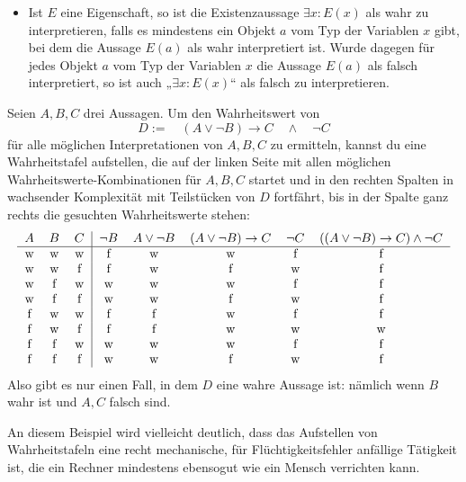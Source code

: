 \begin{de}[Interpretation]
\begin{itemize}
        \item Ist $E$ eine Eigenschaft, so ist die Existenzaussage $\exists x: E(x)$ als wahr zu interpretieren, falls es mindestens ein Objekt $a$ vom Typ der Variablen $x$ gibt, bei dem die Aussage $E(a)$ als wahr interpretiert ist. Wurde dagegen für jedes Objekt $a$ vom Typ der Variablen $x$ die Aussage $E(a)$ als falsch interpretiert, so ist auch „$\exists x: E(x)$“ als falsch zu interpretieren.
    \end{itemize}
\end{de}


\begin{bsp}
    Seien $A,B,C$ drei Aussagen. Um den Wahrheitswert von
        \[ D:= \quad (A\lor \neg B) \to C\quad \land\quad \neg C\]
    für alle möglichen Interpretationen von $A,B,C$ zu ermitteln, kannst du eine Wahrheitstafel aufstellen, die auf der linken Seite mit allen möglichen Wahrheitswerte-Kombinationen für $A,B,C$ startet und in den rechten Spalten in wachsender Komplexität mit Teilstücken von $D$ fortfährt, bis in der Spalte ganz rechts die gesuchten Wahrheitswerte stehen:
    \[\begin{tabular}{ccc|ccccc}
        $A$ & $B$ & $C$ & $\neg B$ & $A\lor \neg B$ & $(A\lor \neg B)\to C$ & $\neg C$ & $((A\lor \neg B) \to C)\land \neg C$ \\
        \hline
        w & w & w &  f & w & w & f & f \\
        w & w & f &  f & w & f & w & f \\
        w & f & w &  w & w & w & f & f \\
        w & f & f &  w & w & f & w & f \\
        f & w & w &  f & f & w & f & f \\
        f & w & f &  f & f & w & w & w \\
        f & f & w &  w & w & w & f & f \\
        f & f & f &  w & w & f & w & f
    \end{tabular}\]
    Also gibt es nur einen Fall, in dem $D$ eine wahre Aussage ist: nämlich wenn $B$ wahr ist und $A,C$ falsch sind.
    
    An diesem Beispiel wird vielleicht deutlich, dass das Aufstellen von Wahrheitstafeln eine recht mechanische, für Flüchtigkeitsfehler anfällige Tätigkeit ist, die ein Rechner mindestens ebensogut wie ein Mensch verrichten kann.
\end{bsp}


